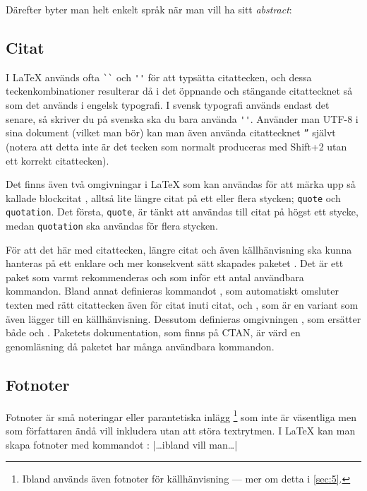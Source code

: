 \documentclass[10pt,../../a4.tex]{subfiles}
\begin{document}
	Därefter byter man helt enkelt språk när man vill ha sitt \emph{abstract}:
\begin{latexcode}
\begin{otherlanguage}{english}
\begin{abstract}
\end{abstract}
\end{otherlanguage}
\begin{abstract}
\end{abstract}
\end{latexcode}

\subsection{Citat}
I \LaTeX{} används ofta \verb|``| och \verb|''| för att typsätta citattecken,
och dessa teckenkombinationer resulterar då i det öppnande och stängande
citattecknet så som det används i engelsk typografi. I svensk typografi
används endast det senare, så skriver du på svenska ska du bara använda
\verb|''|. Använder man UTF-8 i sina dokument (vilket man bör) kan man
även använda citattecknet \verb|”| självt (notera att detta inte är det
tecken som normalt produceras med Shift+2 utan ett korrekt citattecken).

Det finns även två omgivningar i \LaTeX{} som kan användas för att märka upp
så kallade blockcitat , alltså lite längre citat på ett
eller flera stycken; \texttt{quote} och \texttt{quotation}. Det första,
\texttt{quote}, är tänkt att användas till citat på högst ett stycke,
medan \texttt{quotation} ska användas för flera stycken.

För att det här med citattecken, längre citat och även källhänvisning ska
kunna hanteras på ett enklare och mer konsekvent sätt skapades paketet
. Det är ett paket som varmt rekommenderas och som inför
ett antal användbara kommandon. Bland annat definieras kommandot
, som automatiskt omsluter texten med rätt citattecken även
för citat inuti citat, och
, som är en variant som även lägger till en källhänvisning.
Dessutom definieras omgivningen , som ersätter både
 och . Paketets dokumentation, som finns på CTAN,
är värd en genomläsning då paketet har många användbara kommandon.

\subsection{Fotnoter}\label{sec:2:footnote}
Fotnoter är små noteringar eller parantetiska inlägg%
\footnote{Ibland används även fotnoter för källhänvisning — mer om detta
i \cref{sec:5}.} som inte är väsentliga men som författaren ändå
vill inkludera utan att störa textrytmen. I \LaTeX{} kan man skapa 
fotnoter med kommandot :
\latex|\ldots{}ibland vill man\ldots|
\end{document}
